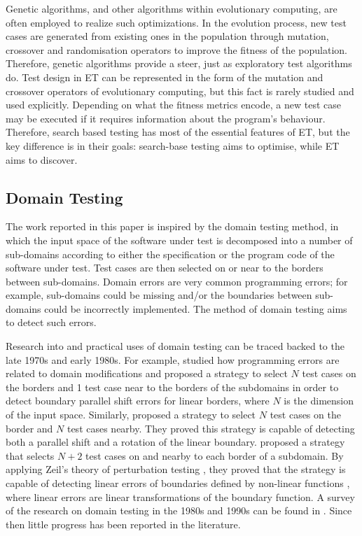 \documentclass[preprint,1p,authoryear,times]{elsarticle}
\begin{document}
Genetic algorithms, and other algorithms within evolutionary computing, are often employed to realize such optimizations. In the evolution process, new test cases are generated from existing ones in the population through mutation, crossover and randomisation operators to improve the fitness of the population. Therefore, genetic algorithms provide a steer, just as exploratory test algorithms do. Test design in ET can be represented in the form of the mutation and crossover operators of evolutionary computing, but this fact is rarely studied and used explicitly. Depending on what the fitness metrics encode, a new test case may be executed if it requires information about the program's behaviour. Therefore, search based testing has most of the essential features of ET, but the key difference is in their goals: search-base testing aims to optimise, while ET aims to discover. 
		
\subsection{Domain Testing}		

The work reported in this paper is inspired by the domain testing method, in which the input space of the software under test is decomposed into a number of sub-domains according to either the specification or the program code of the software under test. Test cases are then selected on or near to the borders between sub-domains. Domain errors are very common programming errors; for example, sub-domains could be missing and/or the boundaries between sub-domains could be incorrectly implemented. The method of domain testing aims to detect such errors.  

Research into and practical uses of domain testing can be traced backed to the late 1970s and early 1980s. For example, \cite{WhiteAndCohen1980} studied how programming errors are related to domain modifications and proposed a strategy to select $N$ test cases on the borders and 1 test case near to the borders of the subdomains in order to detect boundary parallel shift errors for linear borders, where $N$ is the dimension of the input space. Similarly, \citet{Clarke_et_al1982} proposed a strategy to select $N$ test cases on the border and $N$ test cases nearby. They proved this strategy is capable of detecting both a parallel shift and a rotation of the linear boundary. \citet{Afifi_et_al1992} proposed a strategy that selects $N+2$ test cases on and nearby to each border of a subdomain. By applying Zeil's theory of perturbation testing \citep{Zeil1983,Zeil1989}, they proved that the strategy is capable of detecting linear errors of boundaries defined by non-linear functions \citep{ZeilAfifiWhite1992}, where linear errors are linear transformations of the boundary function. A survey of the research on domain testing in the 1980s and 1990s can be found in \citep{ZhuHallMay1997}. Since then little progress has been reported in the literature. 
\end{document}
